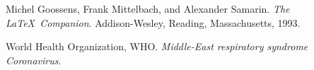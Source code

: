 \begin{thebibliography}{9}
Michel Goossens, Frank Mittelbach, and Alexander Samarin.
\textit{The \LaTeX\ Companion}.
Addison-Wesley, Reading, Massachusetts, 1993.

World Health Organization, WHO.
\textit{Middle-East respiratory syndrome Coronavirus}.
\end{thebibliography}
